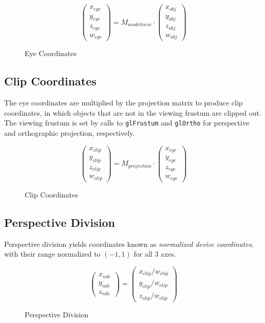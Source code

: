 \documentclass[letterpaper,10pt]{article}
\begin{document}
\begin{figure}[h]
\[
\begin{pmatrix}
x_{eye} \\
y_{eye} \\
z_{eye} \\
w_{eye}
\end{pmatrix}
= M_{modelview} \cdot
\begin{pmatrix}
x_{obj} \\
y_{obj} \\
z_{obj} \\
w_{obj}
\end{pmatrix}
\]
\caption{Eye Coordinates}
\end{figure}

\subsection{Clip Coordinates}
The eye coordinates are multiplied by the projection matrix to produce clip coordinates, in which objects that are not in the viewing frustum are clipped out. The viewing frustum is set by calls to \verb!glFrustum! and \verb!glOrtho! for perspective and orthographic projection, respectively. \\
\begin{figure}[h]
\[
\begin{pmatrix}
x_{clip} \\
y_{clip} \\
z_{clip} \\
w_{clip}
\end{pmatrix}
= M_{projection} \cdot
\begin{pmatrix}
x_{eye} \\
y_{eye} \\
z_{eye} \\
w_{eye}
\end{pmatrix}
\]
\caption{Clip Coordinates}
\end{figure}

\subsection{Perspective Division}
Perspective division yields coordinates known as \emph{normalized device coordinates}, with their range normalized to $(-1,1)$ for all 3 axes.\\
\begin{figure}[h]
\[
\begin{pmatrix}
x_{ndc} \\
y_{ndc} \\
z_{ndc}
\end{pmatrix}
=
\begin{pmatrix}
x_{clip}/w_{clip} \\
y_{clip}/w_{clip} \\
z_{clip}/w_{clip}
\end{pmatrix}
\]
\caption{Perspective Division}
\end{figure}
\end{document}
